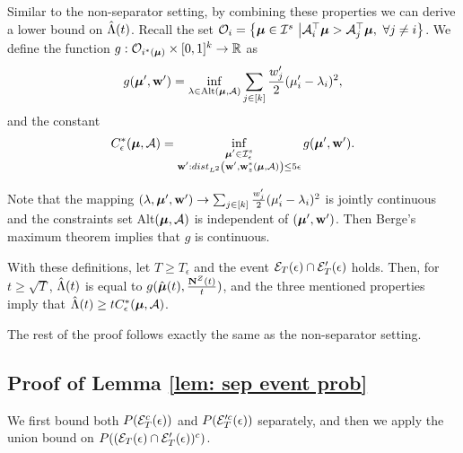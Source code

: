     Similar to the non-separator setting, by combining these properties we can derive a lower bound on $\hat{\Lambda}(t)$. Recall the set $\mathcal{O}_i = \left\{ \boldsymbol{\mu} \in \mathcal{I}^s \ \big| \mathcal{A}_i^\top \boldsymbol{\mu} > \mathcal{A}_j^\top \boldsymbol{\mu}, \ \forall j \neq i \right\}$. We define the function $g: \mathcal{O}_{i^*(\boldsymbol{\mu})} \times [0,1] ^ k \rightarrow \mathbb{R}$ as
    \begin{align*}
        g(\boldsymbol{\mu}', \mathbf{w}') = \inf_{\mathbf{\lambda} \in \text{Alt}(\boldsymbol{\mu}, \mathcal{A})} \sum_{j \in [k]} \frac{w'_j}{2}(\mu'_i - \mathbf{\lambda}_i)^2,
    \end{align*}
    and the constant 
    \begin{align*}
        C^*_{\epsilon}(\boldsymbol{\mu}, \mathcal{A}) = \inf_{\substack{\boldsymbol{\mu}' \in \mathcal{I}^s_{\epsilon} \\ \mathbf{w}': dist_{L^2}\left(\mathbf{w}', \mathbf{w}_z^*(\boldsymbol{\mu}, \mathcal{A})\right) \leq 5 \epsilon}} g(\boldsymbol{\mu}', \mathbf{w}').
    \end{align*}

    Note that the mapping $(\mathbf{\lambda}, \boldsymbol{\mu}', \mathbf{w}') \rightarrow \sum_{j \in [k]} \frac{w'_j}{2}(\mu'_i - \mathbf{\lambda}_i)^2$ is jointly continuous and the constraints set Alt$(\boldsymbol{\mu}, \mathcal{A})$ is independent of $(\boldsymbol{\mu}', \mathbf{w}')$. Then Berge's maximum theorem \cite{berge1963topological} implies that $g$ is continuous.
    
    With these definitions, let $T \geq T_{\epsilon}$ and the event $\mathcal{E}_T(\epsilon) \cap \mathcal{E}'_T(\epsilon)$ holds. Then, for $t \geq \sqrt{T}$, $\hat{\Lambda}(t)$ is equal to $g(\hat{\boldsymbol{\mu}}(t), \frac{\mathbf{N}^{Z}(t)}{t})$, and the three mentioned properties imply that $\hat{\Lambda}(t) \geq t C^*_{\epsilon}(\boldsymbol{\mu}, \mathcal{A})$. 

    The rest of the proof follows exactly the same as the non-separator setting.

    \subsection{Proof of Lemma \ref{lem: sep event prob}} \label{subsec: sep event prob}
    We first bound both $P(\mathcal{E}^c_T(\epsilon))$ and $P(\mathcal{E}'^c_T(\epsilon))$ separately, and then we apply the union bound on $P((\mathcal{E}_T(\epsilon) \cap \mathcal{E}'_T(\epsilon))^c)$. 

